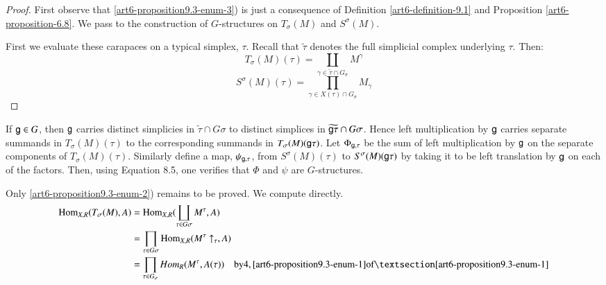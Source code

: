 \begin{proof}
First observe that \ref{art6-proposition9.3-enum-3}) is just a consequence of Definition \ref{art6-definition-9.1} and Proposition \ref{art6-proposition-6.8}. We pass to the construction of $G$-structures on $T_{\sigma}(M)$ and $S^{\sigma}(M)$.

First we evaluate these carapaces on a typical simplex, $\tau$. Recall that $\tilde{\tau}$ denotes the full simplicial complex underlying $\tau$. Then:
$$
T_{\sigma}(M)(\tau) = \coprod_{\gamma \in \tilde{\tau}\cap G_{\sigma}}M^{\gamma}
$$
\begin{equation}\label{art6-eq-9.4}
S^{\sigma}(M)(\tau) = \prod_{\gamma \in X (\tau) \cap G_{\sigma}} M_{\gamma}
\end{equation}
\end{proof}

If $\mathsf{g} \in G$, then $\mathsf{g}$ carries distinct simplicies in $\tilde{\tau} \cap G\sigma$ to distinct simplices in $\widetilde{\mathsf{g} \tau}\cap G\sigma$. Hence left multiplication by $\mathsf{g}$ carries separate summands in $T_{\sigma}(M)(\tau)$ to the corresponding summands in $T_{\sigma}(M)(\mathsf{g} \tau)$. Let $\Phi_{\mathsf{g}, \tau}$ be the sum of left multiplication by $\mathsf{g}$ on the separate components of $T_{\sigma}(M)(\tau)$. Similarly define a map, $\psi_{\mathsf{g}, \tau}$, from $S^{\sigma}(M)(\tau)$ to $S^{\sigma}(M)(\mathsf{g} \tau)$ by taking it to be left translation by $\mathsf{g}$ on each of the factors. Then, using Equation 8.5, one verifies that $\Phi$ and $\psi$ are $G$-structures.

Only \ref{art6-proposition9.3-enum-2}) remains to be proved. We compute directly.
\begin{align*}
\Hom_{X, R}(T_{\sigma}(M), A) &= \Hom_{X, R}(\coprod_{\tau \in G{\sigma}} M^{\tau}, A)\\
& = \prod_{\tau \in G\sigma}\Hom_{X, R}(M^{\tau} \uparrow_{\tau}, A)\\
& = \prod_{\tau \in G_{\sigma}} Hom_{R}(M^{\tau}, A(\tau)) \quad \text{by} 4, \eqref{art6-proposition9.3-enum-1} \text{of} \textsection \ref{art6-proposition9.3-enum-1}
\end{align*}




